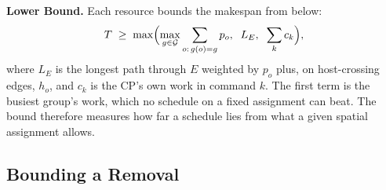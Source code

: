 \textbf{Lower Bound.}
\label{subsec:bound}
Each resource bounds the makespan from below:
\begin{equation}
\label{eq:lb}
T \;\ge\; \max\Bigl(\max_{g \in \mathcal{G}} \sum_{o:\,g(o)=g} p_o,\;\; L_E,\;\; \sum_{k} c_k\Bigr),
\end{equation}
where $L_E$ is the longest path through $E$ weighted by $p_o$ plus, on host-crossing edges, $h_o$, and $c_k$ is the CP's own work in command $k$.
The first term is the busiest group's work, which no schedule on a fixed assignment can beat.
The bound therefore measures how far a schedule lies from what a given spatial assignment allows.


\subsection{Bounding a Removal}
\label{subsec:removal}

